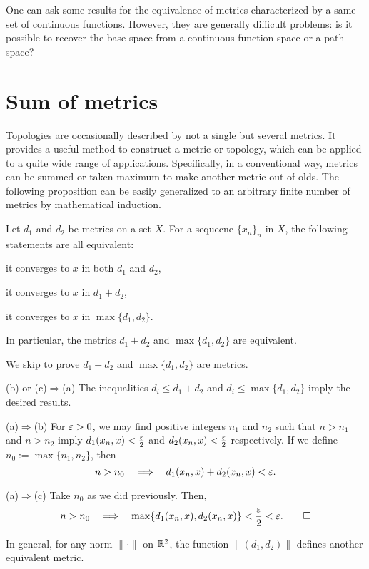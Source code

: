 \documentclass{../note}
\begin{document}
One can ask some results for the equivalence of metrics characterized by a same set of continuous functions.
However, they are generally difficult problems: is it possible to recover the base space from a continuous function space or a path space?

\section{Sum of metrics}
Topologies are occasionally described by not a single but several metrics.
It provides a useful method to construct a metric or topology, which can be applied to a quite wide range of applications.
Specifically, in a conventional way, metrics can be summed or taken maximum to make another metric out of olds.
The following proposition can be easily generalized to an arbitrary finite number of metrics by mathematical induction.

\begin{prop}
Let $d_1$ and $d_2$ be metrics on a set $X$.
For a sequecne $\{x_n\}_n$ in $X$, the following statements are all equivalent:
\begin{parts}
\item it converges to $x$ in both $d_1$ and $d_2$,
\item it converges to $x$ in $d_1+d_2$,
\item it converges to $x$ in $\max\{d_1,d_2\}$.
\end{parts}
In particular, the metrics $d_1+d_2$ and $\max\{d_1,d_2\}$ are equivalent.
\end{prop}
\begin{pf}
We skip to prove $d_1+d_2$ and $\max\{d_1,d_2\}$ are metrics.

(b) or (c)$\Rightarrow$(a)
The inequalities $d_i\le d_1+d_2$ and $d_i\le\max\{d_1,d_2\}$ imply the desired results.

(a)$\Rightarrow$(b)
For $\varepsilon>0$, we may find positive integers $n_1$ and $n_2$ such that $n>n_1$ and $n>n_2$ imply $d_1(x_n,x)<\frac{\varepsilon}2$ and $d_2(x_n,x)<\frac{\varepsilon}2$ respectively.
If we define $n_0:=\max\{n_1,n_2\}$, then
\[n>n_0\impl d_1(x_n,x)+d_2(x_n,x)<\e.\]

(a)$\Rightarrow$(c)
Take $n_0$ as we did previously.
Then,
\[n>n_0\impl\max\{d_1(x_n,x),d_2(x_n,x)\}<\frac\e2<\e.\qedhere\]
\end{pf}

\begin{rmk}
In general, for any norm $\|\cdot\|$ on $\mathbb{R}^2$, the function $\|(d_1,d_2)\|$ defines another equivalent metric.
\end{rmk}
\end{document}
